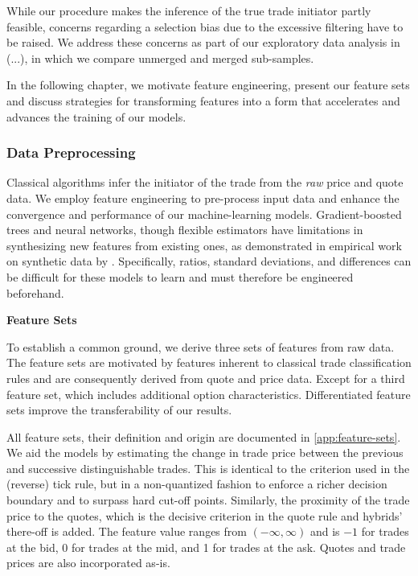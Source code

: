 While our procedure makes the inference of the true trade initiator partly feasible, concerns regarding a selection bias due to the excessive filtering have to be raised. We address these concerns as part of our exploratory data analysis in (...), in which we compare unmerged and merged sub-samples.

In the following chapter, we motivate feature engineering, present our feature sets and discuss strategies for transforming features into a form that accelerates and advances the training of our models.
\subsubsection{Data Preprocessing}\label{sec:data-preprocessing}

Classical algorithms infer the initiator of the trade from the \emph{raw} price and quote data. We employ feature engineering to pre-process input data and enhance the convergence and performance of our machine-learning models. Gradient-boosted trees and neural networks, though flexible estimators have limitations in synthesizing new features from existing ones, as demonstrated in empirical work on synthetic data by \textcite[][5--6]{heatonEmpiricalAnalysisFeature2016}. Specifically, ratios, standard deviations, and differences can be difficult for these models to learn and must therefore be engineered beforehand.

\textbf{Feature Sets}

To establish a common ground, we derive three sets of features from raw data. The feature sets are motivated by features inherent to classical trade classification rules and are consequently derived from quote and price data. Except for a third feature set, which includes additional option characteristics. Differentiated feature sets improve the transferability of our results.

All feature sets, their definition and origin are documented in \cref{app:feature-sets}. We aid the models by estimating the change in trade price between the previous and successive distinguishable trades. This is identical to the criterion used in the (reverse) tick rule, but in a non-quantized fashion to enforce a richer decision boundary and to surpass hard cut-off points. Similarly, the proximity of the trade price to the quotes, which is the decisive criterion in the quote rule and hybrids' there-off is added. The feature value ranges from $\left(-\infty,\infty\right)$ and is $-1$ for trades at the bid, 0 for trades at the mid, and 1 for trades at the ask. Quotes and trade prices are also incorporated as-is.

